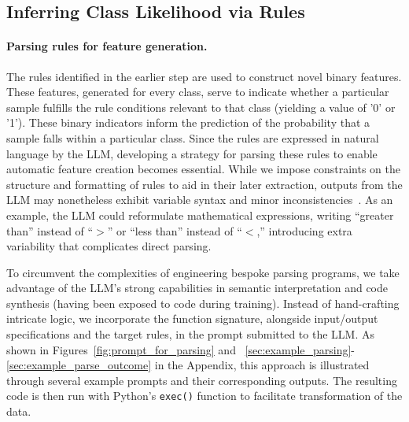 \subsection{Inferring Class Likelihood via Rules}
\label{Sec:training}

\paragraph{Parsing rules for feature generation.} The rules identified in the earlier step are used to construct novel binary features. These features, generated for every class, serve to indicate whether a particular sample fulfills the rule conditions relevant to that class (yielding a value of '0' or '1'). These binary indicators inform the prediction of the probability that a sample falls within a particular class. Since the rules are expressed in natural language by the LLM, developing a strategy for parsing these rules to enable automatic feature creation becomes essential. While we impose constraints on the structure and formatting of rules to aid in their later extraction, outputs from the LLM may nonetheless exhibit variable syntax and minor inconsistencies~\cite{kovavc2023large}. As an example, the LLM could reformulate mathematical expressions, writing ``greater than'' instead of ``$>$'' or ``less than'' instead of ``$<$,'' introducing extra variability that complicates direct parsing.

To circumvent the complexities of engineering bespoke parsing programs, we take advantage of the LLM’s strong capabilities in semantic interpretation and code synthesis (having been exposed to code during training). Instead of hand-crafting intricate logic, we incorporate the function signature, alongside input/output specifications and the target rules, in the prompt submitted to the LLM. As shown in Figures~\ref{fig:prompt_for_parsing} and ~\ref{sec:example_parsing}-\ref{sec:example_parse_outcome} in the Appendix, this approach is illustrated through several example prompts and their corresponding outputs. The resulting code is then run with Python’s \texttt{exec()} function to facilitate transformation of the data.

\vspace*{-0.12in}

